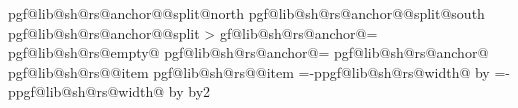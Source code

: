 {{{                            }%
                            \expandafter\addtosavedmacro\csname pgf@lib@sh@rs@anchor@\pgf@lib@sh@rs@number @split@north\endcsname%
                            \expandafter\addtosavedmacro\csname pgf@lib@sh@rs@anchor@\pgf@lib@sh@rs@number @split@south\endcsname%
                            \expandafter\addtosavedmacro\csname pgf@lib@sh@rs@anchor@\pgf@lib@sh@rs@number @split\endcsname%
                        \fi%
                    \fi%
            \repeatpgfmathloop%
        \else%
            \pgf@y=0pt\relax%
            \pgfmathloop%
                \ifnum\pgfmathcounter>\parts%
                \else%
                    \pgf@lib@sh@getalpha\pgf@lib@sh@rs@number{\pgfmathcounter}%
                    \expandafter\let\csname pgf@lib@sh@rs@anchor@\pgf@lib@sh@rs@number\endcsname=\pgfutil@empty%
                    \expandafter\ifx\csname pgf@lib@sh@rs@empty@\pgf@lib@sh@rs@number\endcsname\pgfutil@empty%
                        \ifpgfrectanglesplitignoreemptyparts%
                            \expandafter\let\csname pgf@lib@sh@rs@anchor@\pgf@lib@sh@rs@number\endcsname=%
                                \pgf@lib@sh@rs@lastanchor%
                        \fi%
                    \fi%
                    \expandafter\ifx\csname pgf@lib@sh@rs@anchor@\pgf@lib@sh@rs@number\endcsname\pgfutil@empty%
                        \expandafter\ifx\csname pgf@lib@sh@rs@\pgf@lib@sh@rs@number @item\endcsname%
                                \pgf@lib@sh@rs@lefttext%
                            \pgf@x=0pt\relax%
                        \else%
                            \expandafter\ifx\csname pgf@lib@sh@rs@\pgf@lib@sh@rs@number @item\endcsname%
                                    \pgf@lib@sh@rs@righttext%
                                \pgf@x=-\csname pgf@lib@sh@rs@width@\pgf@lib@sh@rs@number\endcsname\relax%
                                \advance\pgf@x by\pgf@lib@sh@rs@max@width\relax%
                            \else%
                                \pgf@x=-\csname pgf@lib@sh@rs@width@\pgf@lib@sh@rs@number\endcsname\relax%
                                \advance\pgf@x by\pgf@lib@sh@rs@max@width\relax%
                                \divide\pgf@x by2\relax%
                        \fi%
                    \fi%
                    \ifnum{}\relax%
}}
